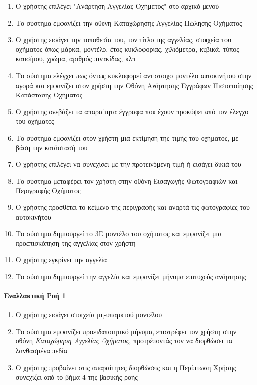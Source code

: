 \documentclass{../ol-softwaremanual}
\begin{document}
	\begin{enumerate}		
		\item Ο χρήστης επιλέγει \en"\gr Ανάρτηση Αγγελίας Οχήματος\en" \gr στο αρχικό μενού
		\item Το σύστημα εμφανίζει την οθόνη Καταχώρησης Αγγελίας Πώλησης Οχήματος
		\item Ο χρήστης εισάγει την τοποθεσία του, τον τίτλο της αγγελίας, στοιχεία του οχήματος όπως μάρκα, μοντέλο, έτος κυκλοφορίας, χιλιόμετρα, κυβικά, τύπος καυσίμου, χρώμα, αριθμός πινακίδας, κλπ
		\item Το σύστημα ελέγχει πως όντως κυκλοφορεί αντίστοιχο μοντέλο αυτοκινήτου στην αγορά και εμφανίζει στον χρήστη την Οθόνη Ανάρτησης Εγγράφων Πιστοποίησης Κατάστασης Οχήματος
		\item Ο χρήστης ανεβάζει τα απαραίτητα έγγραφα που έχουν προκύψει από τον έλεγχο του οχήματος		
		\item Το σύστημα εμφανίζει στον χρήστη μια εκτίμηση της τιμής του οχήματος, με βάση την κατάστασή του
		\item Ο χρήστης επιλέγει να συνεχίσει με την προτεινόμενη τιμή ή εισάγει δικιά του
		\item Το σύστημα μεταφέρει τον χρήστη στην οθόνη Εισαγωγής Φωτογραφιών και Περιγραφής Οχήματος
		\item Ο χρήστης προσθέτει το κείμενο της περιγραφής και αναρτά τις φωτογραφίες του αυτοκινήτου
		\item Το σύστημα δημιουργεί το \en 3D \gr μοντέλο του οχήματος και εμφανίζει μια προεπισκόπηση της αγγελίας στον χρήστη
		\item Ο χρήστης εγκρίνει την αγγελία
		\item Το σύστημα δημιουργεί την αγγελία και εμφανίζει μήνυμα επιτυχούς ανάρτησης
	\end{enumerate}
	
	\paragraph{Εναλλακτική Ροή 1}
	
	\begin{enumerate}
		\item O χρήστης εισάγει στοιχεία μη-υπαρκτού μοντέλου
		\item Το σύστημα εμφανίζει προειδοποιητικό μήνυμα, επιστρέφει τον χρήστη στην οθόνη \textit{Καταχώρηση Αγγελίας Οχήματος}, προτρέποντάς τον να διορθώσει τα λανθασμένα πεδία
		\item Ο χρήστης προβαίνει στις απαραίτητες διορθώσεις και η Περίπτωση Χρήσης συνεχίζει από το βήμα 4 της βασικής ροής
	\end{enumerate}
	
\end{document}
